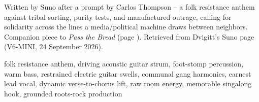 
\label{sec:hold-the-line}
\begin{notes}
Written by Suno after a prompt by Carlos Thompson -- a folk resistance anthem against tribal sorting, purity tests, and manufactured outrage, calling for solidarity across the lines a media/political machine draws between neighbors. Companion piece to \emph{Pass the Bread} (page \pageref{sec:pass-the-bread}). Retrieved from Dvigitt's Suno page (V6-MINI, 24 September 2026).
\end{notes}
\begin{style}
folk resistance anthem, driving acoustic guitar strum, foot-stomp percussion, warm bass, restrained electric guitar swells, communal gang harmonies, earnest lead vocal, dynamic verse-to-chorus lift, raw room energy, memorable singalong hook, grounded roots-rock production
\end{style}
